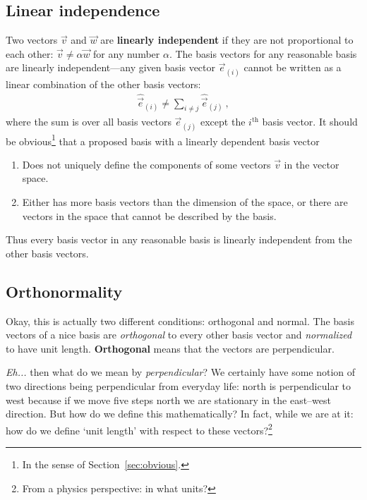 \documentclass[
  11pt,
	colorful,
	raggedright,
]{tufte-style-thesis-flip}
\begin{document}
\subsection{Linear independence}

Two vectors $\vec{v}$ and $\vec{w}$ are \textbf{linearly independent} if they are not proportional to each other: $\vec{v} \neq \alpha \vec{w}$ for any number $\alpha$. The basis vectors for any reasonable basis are linearly independent---any given basis vector $\vec{e}_{(i)}$ cannot be written as a linear combination of the other basis vectors:
\begin{align}
\hat{\vec{e}}_{(i)} \neq \sum_{i\neq j}\hat{\vec{e}}_{(j)} \ ,
\end{align}
where the sum is over all basis vectors $\vec{e}_{(j)}$ except the $i^\text{th}$ basis vector. It should be obvious\footnote{In the sense of Section~\ref{sec:obvious}.} that a proposed basis with a linearly dependent basis vector
\begin{enumerate}
  \item Does not uniquely define the components of some vectors $\vec{v}$ in the vector space.
  \item Either has more basis vectors than the dimension of the space, or there are vectors in the space that cannot be described by the basis.
\end{enumerate}
Thus every basis vector in any reasonable basis is linearly independent from the other basis vectors.

\subsection{Orthonormality}

Okay, this is actually two different conditions: orthogonal and normal. The basis vectors of a nice basis are \emph{orthogonal} to every other basis vector and \emph{normalized} to have unit length. \textbf{Orthogonal} means that the vectors are perpendicular. 

\emph{Eh...} then what do we mean by \emph{perpendicular}? We certainly have some notion of two directions being perpendicular from everyday life: north is perpendicular to west because if we move five steps north we are stationary in the east--west direction. But how do we define this mathematically? In fact, while we are at it: how do we define `unit length' with respect to these vectors?\footnote{From a physics perspective: in what units?} 
\end{document}
